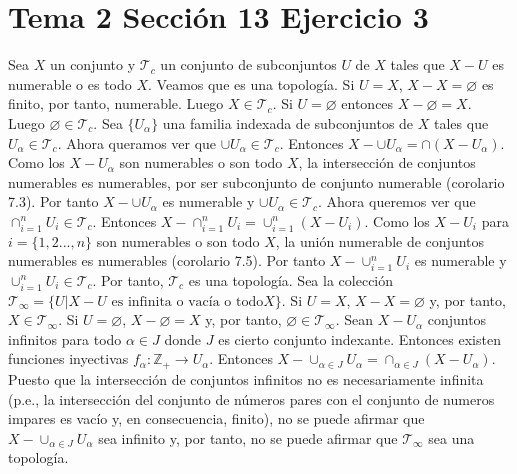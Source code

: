\documentclass{article}
\begin{document}
\section{Tema 2 Sección 13 Ejercicio 3}
Sea $X$ un conjunto y $\mathcal{T}_{c}$ un conjunto de subconjuntos $U$ de $X$ tales que $X-U$ es numerable o es todo $X$. Veamos que es una topología. Si $U=X$, $X-X=\varnothing$ es finito, por tanto, numerable. Luego $X\in \mathcal{T}_{c}$. Si $U=\varnothing$ entonces $X-\varnothing=X$. Luego $\varnothing\in \mathcal{T}_{c}$. Sea $\{U_\alpha\}$ una familia indexada de subconjuntos de $X$ tales que $U_\alpha\in \mathcal{T}_{c}$. Ahora queramos ver que $\cup U_\alpha\in \mathcal{T}_c$. Entonces $X-\cup U_\alpha=\cap (X-U_\alpha)$. Como los $X-U_\alpha$ son numerables o son todo $X$, la intersección de conjuntos numerables es numerables, por ser subconjunto de conjunto numerable (corolario 7.3). Por tanto $X-\cup U_\alpha$ es numerable y $\cup U_\alpha\in \mathcal{T}_c$. Ahora queremos ver que $\cap_{i=1}^{n} U_i\in \mathcal{T}_c$. Entonces $X-\cap_{i=1}^{n} U_i=\cup_{i=1}^{n}(X-U_i)$. Como los $X-U_i$ para $i=\{1,2...,n\}$ son numerables o son todo $X$, la unión numerable de conjuntos numerables es numerables (corolario 7.5). Por tanto $X-\cup_{i=1}^{n} U_i$ es numerable y $\cup_{i=1}^{n} U_i\in \mathcal{T}_c$. Por tanto, $\mathcal{T}_c$ es una topología.
Sea la colección $\mathcal{T}_{\infty}=\{U|X-U\text{ es infinita o vacía o todo} X\}$. Si $U=X$, $X-X=\varnothing$ y, por tanto, $X\in \mathcal{T}_{\infty}$. Si $U=\varnothing$, $X-\varnothing=X$ y, por tanto, $\varnothing\in \mathcal{T}_{\infty}$. Sean $X-U_\alpha$ conjuntos infinitos para todo $\alpha \in J$ donde $J$ es cierto conjunto indexante. Entonces existen funciones inyectivas $f_\alpha: \mathbb{Z}_{+}\rightarrow U_\alpha$. Entonces $X-\cup_{\alpha\in J} U_\alpha=\cap_{\alpha\in J} (X-U_\alpha)$. Puesto que la intersección de conjuntos infinitos no es necesariamente infinita (p.e., la intersección del conjunto de números pares con el conjunto de numeros impares es vacío y, en consecuencia, finito), no se puede afirmar que $X-\cup_{\alpha\in J} U_\alpha$ sea infinito y, por tanto, no se puede afirmar que $\mathcal{T}_{\infty}$ sea una topología.
\end{document}
